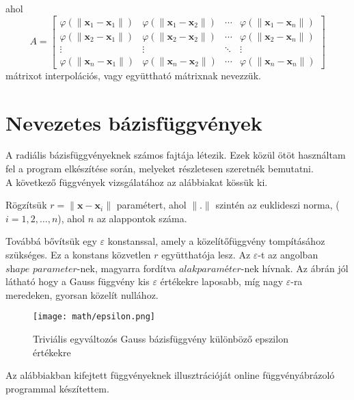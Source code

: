 		ahol
		\begin{equation}
			A = 
			\begin{bmatrix}
			\varphi(\|\mathbf{x}_1 - \mathbf{x}_1\|) & \varphi(\|\mathbf{x}_1 - \mathbf{x}_2\|) & \cdots & \varphi(\|\mathbf{x}_1 - \mathbf{x}_n\|) \\
			\varphi(\|\mathbf{x}_2 - \mathbf{x}_1\|) & \varphi(\|\mathbf{x}_2 - \mathbf{x}_2\|) & \cdots & \varphi(\|\mathbf{x}_2 - \mathbf{x}_n\|) \\
			\vdots    & \vdots     & \ddots & \vdots\\
			\varphi(\|\mathbf{x}_n - \mathbf{x}_1\|) & \varphi(\|\mathbf{x}_n - \mathbf{x}_2\|) & \cdots & \varphi(\|\mathbf{x}_n - \mathbf{x}_n\|)
			\end{bmatrix}\label{eq:kettes}
		\end{equation}
		mátrixot interpolációs, vagy együttható mátrixnak nevezzük. \cite{intpolmatr}
		
		\section{Nevezetes bázisfüggvények}
		
		A radiális bázisfüggvényeknek számos fajtája létezik. Ezek közül ötöt használtam fel a program elkészítése során, melyeket részletesen szeretnék bemutatni.\\	
		A következő függvények vizsgálatához az alábbiakat kössük ki.
		
		Rögzítsük $r = \|\mathbf{x} - \mathbf{x}_i\|$ paramétert, ahol $\|.\|$ szintén az euklideszi norma, ($i=1,2,\ldots,n$), ahol $n$ az alappontok száma.
		
		Továbbá bővítsük egy $\varepsilon$ konstanssal, amely a közelítőfüggvény tompításához szükséges. Ez a konstans közvetlen $r$ együtthatója lesz. Az $\varepsilon$-t az angolban $\textit{shape parameter}$-nek, \cite{rbf} magyarra fordítva $\textit{alakparaméter}$-nek hívnak. Az ábrán jól látható hogy a Gauss függvény kis $\varepsilon$ értékekre laposabb, míg nagy $\varepsilon$-ra meredeken, gyorsan közelít nullához.	
		\begin{figure}[h!]
			\centering
			\texttt{[image: math/epsilon.png]}
			\caption{Triviális egyváltozós Gauss bázisfüggvény különböző epszilon értékekre \cite{epsilon}}
		\end{figure}
	
		Az alábbiakban kifejtett függvényeknek illusztrációját online függvényábrázoló programmal készítettem. \cite{szerkeszto} 
		 
